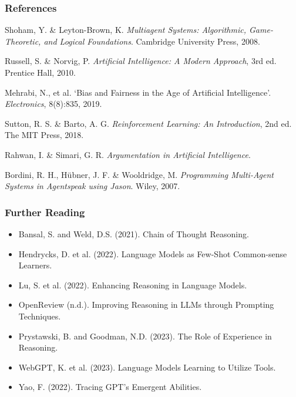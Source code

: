 \documentclass{beamer}
\begin{document}
\begin{frame}[allowframebreaks]
\frametitle{References}
\begin{thebibliography}{10}
\small
\vspace{-0.8cm} %

    Shoham, Y. \& Leyton-Brown, K.
    \newblock \textit{Multiagent Systems: Algorithmic, Game-Theoretic, and Logical Foundations}.
    \newblock Cambridge University Press, 2008.
    
    Russell, S. \& Norvig, P.
    \newblock \textit{Artificial Intelligence: A Modern Approach}, 3rd ed.
    \newblock Prentice Hall, 2010.
    
    Mehrabi, N., et al.
    \newblock ‘Bias and Fairness in the Age of Artificial Intelligence’.
    \newblock \textit{Electronics}, 8(8):835, 2019.
    
    Sutton, R. S. \& Barto, A. G.
    \newblock \textit{Reinforcement Learning: An Introduction}, 2nd ed.
    \newblock The MIT Press, 2018.
    
    Rahwan, I. \& Simari, G. R.
    \newblock \textit{Argumentation in Artificial Intelligence}.
    
    Bordini, R. H., Hübner, J. F. \& Wooldridge, M.
    \newblock \textit{Programming Multi-Agent Systems in Agentspeak using Jason}.
    \newblock Wiley, 2007.
\end{thebibliography}
\end{frame}

\begin{frame}[allowframebreaks]
\frametitle{Further Reading}
\begin{itemize}
    \item Bansal, S. and Weld, D.S. (2021). Chain of Thought Reasoning.
    \item Hendrycks, D. et al. (2022). Language Models as Few-Shot Common-sense Learners.
    \item Lu, S. et al. (2022). Enhancing Reasoning in Language Models.
    \item OpenReview (n.d.). Improving Reasoning in LLMs through Prompting Techniques.
    \item Prystawski, B. and Goodman, N.D. (2023). The Role of Experience in Reasoning.
    \item WebGPT, K. et al. (2023). Language Models Learning to Utilize Tools.
    \item Yao, F. (2022). Tracing GPT's Emergent Abilities.
\end{itemize}
\end{frame}
\end{document}
